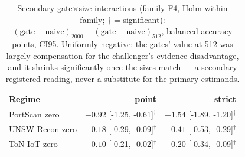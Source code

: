 \begin{table}
\centering
\caption{Secondary gate$\times$size interactions (family F4, Holm within family;
$\dagger$ = significant): $(\mathrm{gate}-\mathrm{naive})_{2000} -
(\mathrm{gate}-\mathrm{naive})_{512}$, balanced-accuracy points, CI95. Uniformly
negative: the gates' value at 512 was largely compensation for the challenger's evidence
disadvantage, and it shrinks significantly once the sizes match --- a secondary registered
reading, never a substitute for the primary estimands.}
\label{tab:size_matched_supp_interaction}
\small
\begin{tabular}{l r r}
\toprule
Regime & point & strict \\
\midrule
PortScan zero & $-0.92$ [-1.25, -0.61]$^{\dagger}$ & $-1.54$ [-1.89, -1.20]$^{\dagger}$ \\
UNSW-Recon zero & $-0.18$ [-0.29, -0.09]$^{\dagger}$ & $-0.41$ [-0.53, -0.29]$^{\dagger}$ \\
ToN-IoT zero & $-0.10$ [-0.21, -0.02]$^{\dagger}$ & $-0.20$ [-0.34, -0.09]$^{\dagger}$ \\
\bottomrule
\end{tabular}
\end{table}
